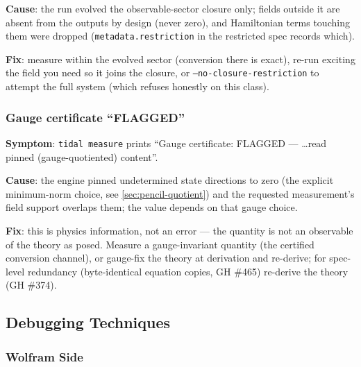 \textbf{Cause}: the run evolved the observable-sector closure only;
fields outside it are absent from the outputs by design (never zero),
and Hamiltonian terms touching them were dropped
(\texttt{metadata.restriction} in the restricted spec records which).

\textbf{Fix}: measure within the evolved sector (conversion there is
exact), re-run exciting the field you need so it joins the closure, or
\texttt{--no-closure-restriction} to attempt the full system (which
refuses honestly on this class).

\subsubsection{Gauge certificate ``FLAGGED''}
\label{sec:troubleshooting-gauge-flagged}

\textbf{Symptom}: \texttt{tidal measure} prints ``Gauge certificate:
FLAGGED --- \ldots read pinned (gauge-quotiented) content''.

\textbf{Cause}: the engine pinned undetermined state directions to zero
(the explicit minimum-norm choice, see \cref{sec:pencil-quotient}) and
the requested measurement's field support overlaps them; the value
depends on that gauge choice.

\textbf{Fix}: this is physics information, not an error --- the quantity
is not an observable of the theory as posed. Measure a gauge-invariant
quantity (the certified conversion channel), or gauge-fix the theory at
derivation and re-derive; for spec-level redundancy (byte-identical
equation copies, GH \#465) re-derive the theory (GH \#374).

\subsection{Debugging Techniques}
\label{sec:debugging-techniques}

\subsubsection{Wolfram Side}

